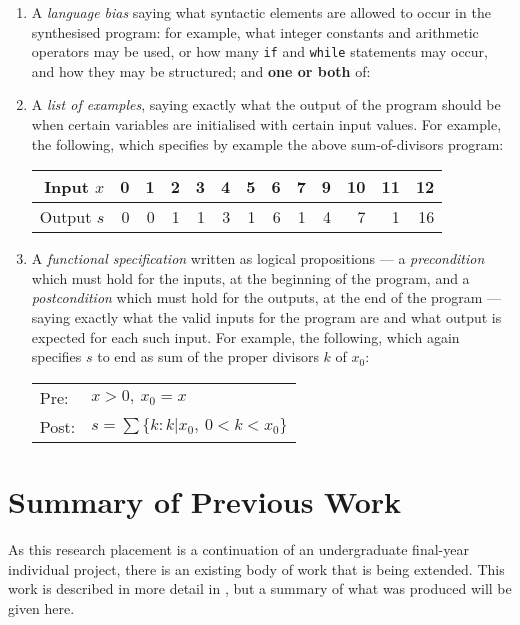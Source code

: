 \documentclass[a4paper,twoside,notitlepage,12pt]{article}
\begin{document}
\begin{enumerate}
    \item A \emph{language bias} saying what syntactic elements are allowed to occur in 
    the synthesised program: for example, what integer constants and arithmetic 
    operators may be used, or how many \verb|if| and \verb|while| statements may 
    occur, and how they may be structured; and \textbf{one or both} of:

    \item A \emph{list of examples}, saying exactly what the output of the program 
    should be when certain variables are initialised with certain input values. For 
    example, the following, which specifies by example the above 
    sum-of-divisors program:
    
    \begin{tabular}{| r || r | r | r | r | r | r | r | r | r | r | r | r |}
        \hline
        Input $x$  & 0 & 1 & 2 & 3 & 4 & 5 & 6 & 7 & 9 & 10 & 11 & 12 \\
        \hline
        Output $s$ & 0 & 0 & 1 & 1 & 3 & 1 & 6 & 1 & 4 &  7 &  1 & 16 \\
        \hline
    \end{tabular}

    \item A \emph{functional specification} written as logical propositions --- a 
    \emph{precondition} which must hold for the inputs, at the beginning of the 
    program, and a \emph{postcondition} which must hold for the outputs, at the end of 
    the program --- saying exactly what the valid inputs for the program are and 
    what output is expected for each such input. For example, the following, which 
    again specifies $s$ to end as sum of the proper divisors $k$ of $x_0$:
    
    \begin{tabular}{|ll|}
        \hline
        Pre:  & $x > 0,\ x_0 = x$ \\
        Post: & $s = \sum\{k : k|x_0,\ 0<k<x_0\}$ \\
        \hline
    \end{tabular}
    
\end{enumerate}

\clearpage
\section{Summary of Previous Work}

As this research placement is a continuation of an undergraduate final-year individual 
project, there is an existing body of work that is being extended. This work is 
described in more detail in \cite{final}, but a summary of what was produced will be 
given here.
\end{document}
